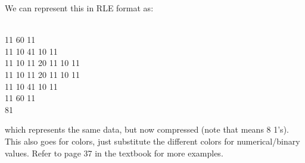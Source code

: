 \documentclass[../main.tex]{subfiles}
\begin{document}
We can represent this in RLE format as:

{\\
    11 60 11\\
    11 10 41 10 11\\
    11 10 11 20 11 10 11\\
    11 10 11 20 11 10 11\\
    11 10 41 10 11\\
    11 60 11\\
    81\\
\medskip}

which represents the same data, but now compressed (note that {} means 8 1's). This also goes for colors, just substitute the different colors for numerical/binary values. Refer to page 37 in the textbook for more examples.
\end{document}
